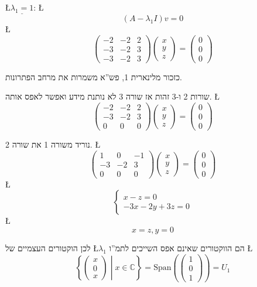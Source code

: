\documentclass[english,hebrew]{article}
\begin{document}
\L{$\underline{\lambda_{1}=1}$}: \L{%
\[
\left(A-\lambda_{1}I\right)v=0
\]
}%
\L{%
\[
\begin{pmatrix}-2 & -2 & 2\\
-3 & -2 & 3\\
-3 & -2 & 3
\end{pmatrix}\begin{pmatrix}x\\
y\\
z
\end{pmatrix}=\begin{pmatrix}0\\
0\\
0
\end{pmatrix}
\]
}%

כזכור מלינארית 1, פש\textquotedblright א משמרות את מרחב הפתרונות.

שורות 2 ו-3 זהות אז שורה 3 לא נותנת מידע ואפשר לאפס אותה. \L{%
\[
\begin{pmatrix}-2 & -2 & 2\\
-3 & -2 & 3\\
0 & 0 & 0
\end{pmatrix}\begin{pmatrix}x\\
y\\
z
\end{pmatrix}=\begin{pmatrix}0\\
0\\
0
\end{pmatrix}
\]
}%

נוריד משורה 1 את שורה 2. \L{%
\[
\begin{pmatrix}1 & 0 & -1\\
-3 & -2 & 3\\
0 & 0 & 0
\end{pmatrix}\begin{pmatrix}x\\
y\\
z
\end{pmatrix}=\begin{pmatrix}0\\
0\\
0
\end{pmatrix}
\]
}%
\L{%
\[
\begin{cases}
x-z=0\\
-3x-2y+3z=0
\end{cases}
\]
}%
\L{%
\[
x=z,y=0
\]
}%

לכן הוקטורים העצמיים של \L{$\lambda_{1}$} הם הווקטורים שאינם אפס
השייכים לתמ\textquotedblright ו \L{%
\[
\left\{ \begin{pmatrix}x\\
0\\
x
\end{pmatrix}\middle|x\in\mathbb{C}\right\} =\text{Span}\left(\begin{pmatrix}1\\
0\\
1
\end{pmatrix}\right)=U_{1}
\]
}%
\end{document}
